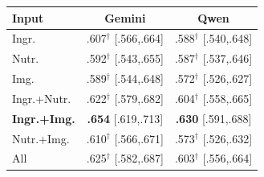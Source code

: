 \begin{center}
\label{tab:ablation-llm}
\footnotesize
\setlength{\tabcolsep}{4pt}
\renewcommand{\arraystretch}{0.95}
\begin{tabular}{@{}lcc@{}}
\toprule
Input & Gemini & Qwen \\
\midrule
Ingr. & .607$^\dag$ [.566,.664] & .588$^\dag$ [.540,.648] \\
Nutr. & .592$^\dag$ [.543,.655] & .587$^\dag$ [.537,.646] \\
Img. & .589$^\dag$ [.544,.648] & .572$^\dag$ [.526,.627] \\
Ingr.+Nutr. & .622$^\dag$ [.579,.682] & .604$^\dag$ [.558,.665] \\
\textbf{Ingr.+Img.} & \textbf{.654} [.619,.713] & \textbf{.630} [.591,.688] \\
Nutr.+Img. & .610$^\dag$ [.566,.671] & .573$^\dag$ [.526,.632] \\
All & .625$^\dag$ [.582,.687] & .603$^\dag$ [.556,.664] \\
\bottomrule
\end{tabular}
\end{center}
